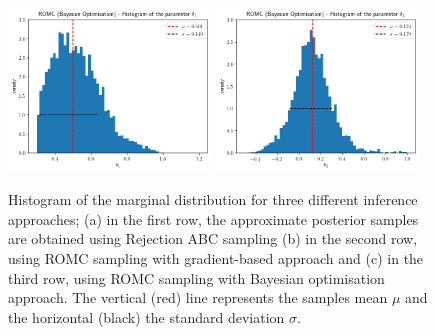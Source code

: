 \begin{figure}[h]
\begin{center}
      \includegraphics[width=0.48\textwidth]{./Thesis/images/chapter4/mae2_hist_t1_romc_bo.png}
      \includegraphics[width=0.48\textwidth]{./Thesis/images/chapter4/mae2_hist_t2_romc_bo.png}\\
    \end{center}
    \caption{Histogram of the marginal distribution for three
      different inference approaches; (a) in the first row, the
      approximate posterior samples are obtained using Rejection ABC
      sampling (b) in the second row, using ROMC sampling with
      gradient-based approach and (c) in the third row, using ROMC
      sampling with Bayesian optimisation approach. The vertical (red)
      line represents the samples mean $\mu$ and the horizontal
      (black) the standard deviation $\sigma$.}
  \label{fig:ma2_3}
\end{figure}



